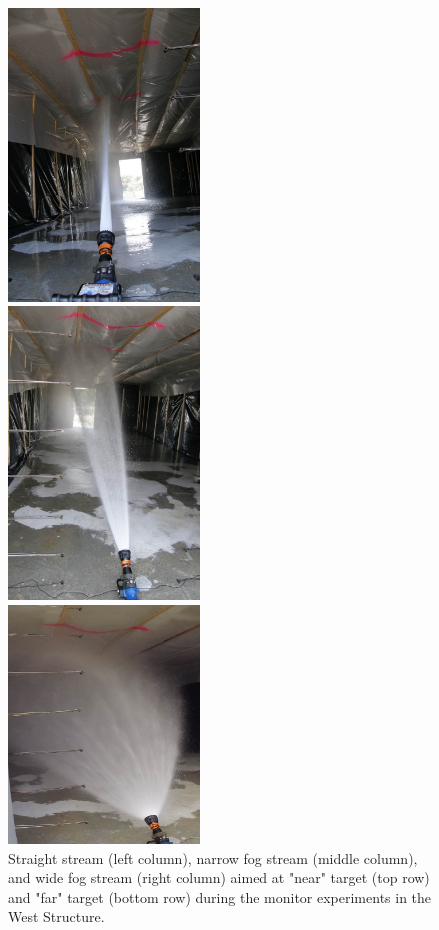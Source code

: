 \documentclass[12pt,oneside]{book}
\begin{document}
\begin{figure}[!ht]
\begin{center}
	\end{center}
	\endminipage \hfill
	\vspace{0.15in}
	\minipage{2.15in}
	\begin{center}
		\includegraphics[width=2in]{../Figures/Pictures/SS_far}
	\end{center} 
	\endminipage \hfill
	\minipage{2.15in}
	\begin{center}
		\includegraphics[width=2in]{../Figures/Pictures/NF_far}
	\end{center}
	\endminipage \hfill
	\minipage{2.15in}
	\begin{center}
		\includegraphics[width=2in]{../Figures/Pictures/WF_far}
	\end{center}
	\endminipage \hfill
	\caption[Straight stream, narrow fog stream, and wide fog stream aimed at the near and far targets in the West Structure.]{Straight stream (left column), narrow fog stream (middle column), and wide fog stream (right column) aimed at "near" target (top row) and "far" target (bottom row) during the monitor experiments in the West Structure.}
	\label{fig:test_16_17_pic}
\end{figure}
\FloatBarrier
\end{document}
